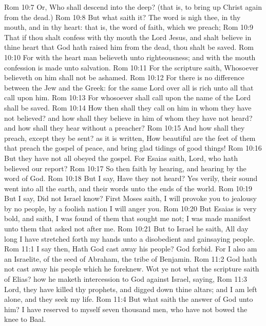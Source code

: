 \vs Rom 10:7 Or, Who shall descend into the deep? (that is, to bring up Christ again from the dead.)
\vs Rom 10:8 But what saith it? The word is nigh thee,  in thy mouth, and in thy heart: that is, the word of faith, which we preach;
\vs Rom 10:9 That if thou shalt confess with thy mouth the Lord Jesus, and shalt believe in thine heart that God hath raised him from the dead, thou shalt be saved.
\vs Rom 10:10 For with the heart man believeth unto righteousness; and with the mouth confession is made unto salvation.
\vs Rom 10:11 For the scripture saith, Whosoever believeth on him shall not be ashamed.
\vs Rom 10:12 For there is no difference between the Jew and the Greek: for the same Lord over all is rich unto all that call upon him.
\vs Rom 10:13 For whosoever shall call upon the name of the Lord shall be saved.
\vs Rom 10:14 How then shall they call on him in whom they have not believed? and how shall they believe in him of whom they have not heard? and how shall they hear without a preacher?
\vs Rom 10:15 And how shall they preach, except they be sent? as it is written, How beautiful are the feet of them that preach the gospel of peace, and bring glad tidings of good things!
\vs Rom 10:16 But they have not all obeyed the gospel. For Esaias saith, Lord, who hath believed our report?
\vs Rom 10:17 So then faith  by hearing, and hearing by the word of God.
\vs Rom 10:18 But I say, Have they not heard? Yes verily, their sound went into all the earth, and their words unto the ends of the world.
\vs Rom 10:19 But I say, Did not Israel know? First Moses saith, I will provoke you to jealousy by  no people,  by a foolish nation I will anger you.
\vs Rom 10:20 But Esaias is very bold, and saith, I was found of them that sought me not; I was made manifest unto them that asked not after me.
\vs Rom 10:21 But to Israel he saith, All day long I have stretched forth my hands unto a disobedient and gainsaying people.
\vs Rom 11:1 I say then, Hath God cast away his people? God forbid. For I also am an Israelite, of the seed of Abraham,  the tribe of Benjamin.
\vs Rom 11:2 God hath not cast away his people which he foreknew. Wot ye not what the scripture saith of Elias? how he maketh intercession to God against Israel, saying,
\vs Rom 11:3 Lord, they have killed thy prophets, and digged down thine altars; and I am left alone, and they seek my life.
\vs Rom 11:4 But what saith the answer of God unto him? I have reserved to myself seven thousand men, who have not bowed the knee to  Baal.

